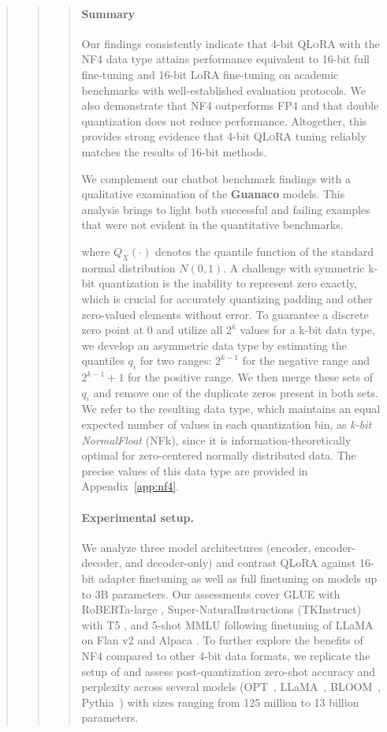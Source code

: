 \begin{quote}
\begin{quote}
\begin{quote}
\paragraph{Summary} Our findings consistently indicate that 4-bit \textsc{QLoRA} with the NF4 data type attains performance equivalent to 16-bit full fine-tuning and 16-bit LoRA fine-tuning on academic benchmarks with well-established evaluation protocols. We also demonstrate that NF4 outperforms FP4 and that double quantization does not reduce performance. Altogether, this provides strong evidence that 4-bit \textsc{QLoRA} tuning reliably matches the results of 16-bit methods.

We complement our chatbot benchmark findings with a qualitative examination of the \textbf{Guanaco} models. This analysis brings to light both successful and failing examples that were not evident in the quantitative benchmarks.

where $Q_X(\cdot)$ denotes the quantile function of the standard normal distribution $N(0,1)$. A challenge with symmetric k-bit quantization is the inability to represent zero exactly, which is crucial for accurately quantizing padding and other zero-valued elements without error. To guarantee a discrete zero point at $0$ and utilize all $2^k$ values for a k-bit data type, we develop an asymmetric data type by estimating the quantiles $q_i$ for two ranges: $2^{k-1}$ for the negative range and $2^{k-1}+1$ for the positive range. We then merge these sets of $q_i$ and remove one of the duplicate zeros present in both sets. We refer to the resulting data type, which maintains an equal expected number of values in each quantization bin, as \emph{k-bit NormalFloat} (NFk), since it is information-theoretically optimal for zero-centered normally distributed data. The precise values of this data type are provided in Appendix~\ref{app:nf4}.

\paragraph{Experimental setup.} We analyze three model architectures (encoder, encoder-decoder, and decoder-only) and contrast QLoRA against 16-bit adapter finetuning as well as full finetuning on models up to 3B parameters. Our assessments cover GLUE \citep{wang2018glue} with RoBERTa-large \citep{liu2019roberta}, Super-NaturalInstructions (TKInstruct) \citep{wang2022super} with T5 \citep{t5}, and 5-shot MMLU \citep{hendrycksmeasuring} following finetuning of LLaMA on Flan v2 \citep{longpre2023flan} and Alpaca \citep{alpaca}. To further explore the benefits of NF4 compared to other 4-bit data formats, we replicate the setup of \citet{dettmers2022case} and assess post-quantization zero-shot accuracy and perplexity across several models (OPT~\citep{zhang2022opt}, LLaMA~\citep{touvron2023llama}, BLOOM~\citep{scao2022bloom}, Pythia~\citep{biderman2023pythia}) with sizes ranging from 125 million to 13 billion parameters.


\end{quote}
\end{quote}
\end{quote}
